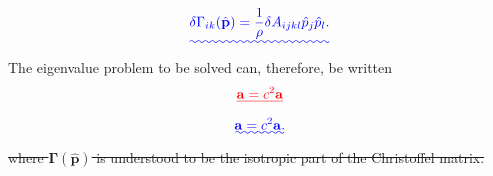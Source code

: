 \documentclass [a4paper,12pt]{paper}
\providecommand{\DIFadd}[1]{{\protect\color{blue}\uwave{#1}}} %
\providecommand{\DIFdel}[1]{{\protect\color{red}\sout{#1}}}                      %
\providecommand{\DIFaddbegin}{} %
\providecommand{\DIFaddend}{} %
\providecommand{\DIFdelbegin}{} %
\providecommand{\DIFdelend}{} %
\begin{document}
\DIFdelend \DIFaddbegin \begin{equation}
\DIFadd{\delta\Gamma_{ik}(\hat{\mathbf{p}})=\frac{1}{\rho}\delta A_{ijkl}\hat{p}_{j}\hat{p}_{l}.
\label{eq:32}
}\end{equation}\DIFaddend 
The eigenvalue problem to be solved can, therefore, be written
\DIFdelbegin \begin{displaymath}
[\DIFdel{\bm{\Gamma}(\hat{\mathbf{p}})+s\,\delta\bm{\Gamma}(\hat{\mathbf{p}})}]\DIFdel{\mathbf{a}=c^{2}\mathbf{a}
}\end{displaymath}%
\DIFdelend \DIFaddbegin \begin{equation}
[\DIFadd{\bm{\Gamma}^{0}(\hat{\mathbf{p}})+s\,\delta\bm{\Gamma}(\hat{\mathbf{p}})}]\DIFadd{\mathbf{a}=c^{2}\mathbf{a}.
\label{eq:33}
}\end{equation}\DIFaddend 
\DIFdelbegin \DIFdel{where $\bm{\Gamma}(\hat{\mathbf{p}})$ is understood to be the isotropic part of the Christoffel matrix. 
}\DIFdelend 
\end{document}
